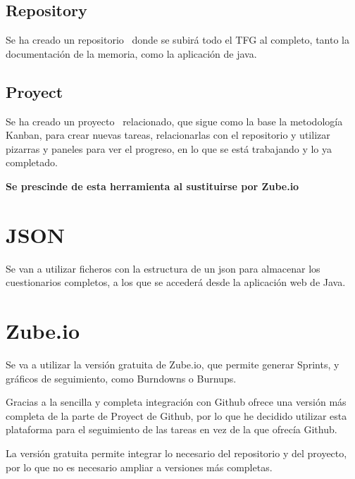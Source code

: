\subsection{Repository}

Se ha creado un repositorio~\cite{github:repo} donde se subirá todo el TFG al completo, tanto la documentación de la memoria, como la aplicación de java.

\subsection{Proyect}

Se ha creado un proyecto~\cite{github:proyect} relacionado, que sigue como la base la metodología Kanban, para crear nuevas tareas, relacionarlas con el repositorio y utilizar pizarras y paneles para ver el progreso, en lo que se está trabajando y lo ya completado.

\textbf{Se prescinde de esta herramienta al sustituirse por Zube.io}

\section{JSON}

Se van a utilizar ficheros con la estructura de un json para almacenar los cuestionarios completos, a los que se accederá desde la aplicación web de Java.

\section{Zube.io}

Se va a utilizar la versión gratuita de Zube.io, que permite generar Sprints, y gráficos de seguimiento, como Burndowns o Burnups.

Gracias a la sencilla y completa integración con Github ofrece una versión más completa de la parte de Proyect de Github, por lo que he decidido utilizar esta plataforma para el seguimiento de las tareas en vez de la que ofrecía Github.

La versión gratuita permite integrar lo necesario del repositorio y del proyecto, por lo que no es necesario ampliar a versiones más completas.







